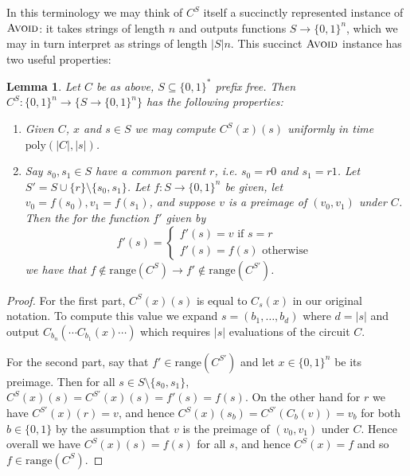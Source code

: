 \documentclass[11pt]{article}
\newtheorem{lemma}{Lemma}
\newcommand{\B}{\{0,1\}}
\newcommand{\rng}{\mathrm{range}}
\newcommand{\poly}{\mathrm{poly}}
\newcommand{\avoid}{\textsc{Avoid}}
\begin{document}
In this terminology we may think of $C^S$ itself a succinctly represented instance of $\avoid$: it takes strings of length $n$ and outputs functions $S \to \B^n$, which we may in turn interpret as strings of length $|S|n$. This succinct $\avoid$ instance has two useful properties:
\begin{lemma}\label{lem:tree}
Let $C$ be as above, $S \subseteq \B^*$ prefix free. Then $C^S: \B^n \to \{S \to \B^n\}$ has the following properties:
\begin{enumerate}
	\item Given $C$, $x$ and $s \in S$ we may compute $C^S(x)(s)$ uniformly in time $\poly(|C|, |s|)$.
	\item Say $s_0, s_1 \in S$ have a common parent $r$, i.e. $s_0 = r0$ and $s_1 = r1$. Let ${S' = S \cup \{r\} \setminus \{s_0,s_1\}}$. Let $f: S \to \B^n$ be given, let $v_0=f(s_0), v_1 = f(s_1)$, and suppose $v$ is a preimage of $(v_0,v_1)$ under $C$. Then the for the function $f'$ given by
	\[
	f'(s) = \begin{cases}
		f'(s) = v \text{ if } s=r\\
		f'(s)= f(s) \text{ otherwise } 
	\end{cases}
	\]
	we have that $f \notin \rng(C^S) \rightarrow f' \notin \rng(C^{S'})$.
\end{enumerate}
\end{lemma}
\begin{proof}
For the first part, $C^S(x)(s)$ is equal to $C_s(x)$ in our original notation. To compute this value we expand $s = (b_1,\ldots,b_d)$ where $d=|s|$ and output $C_{b_n}(\cdots C_{b_1}(x) \cdots )$ which requires $|s|$ evaluations of the circuit $C$.

For the second part, say that $f' \in \rng(C^{S'})$ and let $x \in\B^n$ be its preimage. Then for all $s \in S \setminus \{s_0,s_1\}$, $C^{S}(x)(s) = C^{S'}(x)(s) = f'(s) = f(s)$. On the other hand for $r$ we have $C^{S'}(x)(r) = v$, and hence $C^{S}(x)(s_b) = C^{S'}(C_b(v)) = v_b$ for both $b \in \B$ by the assumption that $v$ is the preimage of $(v_0,v_1)$ under $C$. Hence overall we have $C^S(x)(s) = f(s)$ for all $s$, and hence $C^S(x) = f$ and so $f \in \rng(C^S)$.
\end{proof}
\end{document}

